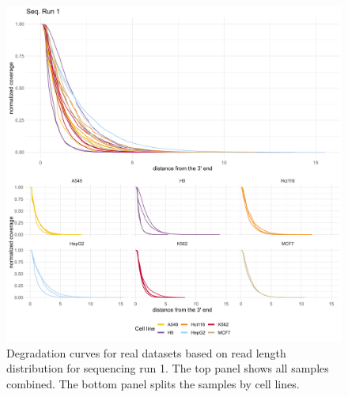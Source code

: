 \begin{figure}[H]
    \centering
    \includegraphics[width=\textwidth]{figures/sec-2-length-sgnex-curves.png}
    \caption[Degradation curves for real datasets based on read length distribution]{Degradation curves for real datasets based on read length distribution for sequencing run 1. The top panel shows all samples combined. The bottom panel splits the samples by cell lines.}
    \label{fig:length-sgnex}
\end{figure}

